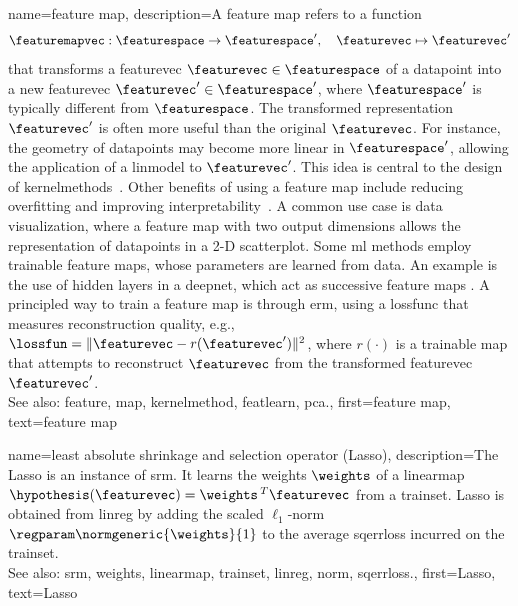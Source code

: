 {name={feature map}, 
	description={A \gls{feature} \gls{map} refers to a \gls{function} 
		$$
		\featuremapvec: \featurespace \rightarrow \featurespace', \quad \featurevec \mapsto \featurevec'
		$$
		that transforms a \gls{featurevec} $\featurevec \in \featurespace$ of 
 		a \gls{datapoint} into a new \gls{featurevec} $\featurevec' \in \featurespace'$, 
 		where $\featurespace'$ is typically different from $\featurespace$.
 		The transformed representation $\featurevec'$ is often more useful than the original 
 		$\featurevec$. For instance, the geometry of \glspl{datapoint} may become more linear 
 		in $\featurespace'$, allowing the application of a \gls{linmodel} to $\featurevec'$. 
 		This idea is central to the design of \glspl{kernelmethod}~\cite{LearningKernelsBook}.
 		Other benefits of using a \gls{feature} \gls{map} include reducing \gls{overfitting} and 
 		improving \gls{interpretability}~\cite{Ribeiro2016}. A common use case is \gls{data} 
 		visualization, where a \gls{feature} \gls{map} with two output dimensions allows the representation 
 		of \glspl{datapoint} in a 2-D \gls{scatterplot}. Some \gls{ml} methods employ trainable 
 		\gls{feature} \glspl{map}, whose \glspl{parameter} are learned from \gls{data}. An example is 
 		the use of hidden \glspl{layer} in a \gls{deepnet}, which act as successive \gls{feature} \glspl{map} 
 		\cite{MallatUnderstandingDeepLearning}. A principled way to train a \gls{feature} \gls{map} 
 		is through \gls{erm}, using a \gls{lossfunc} that measures reconstruction quality, 
 		e.g., $\lossfun = \|\featurevec - r(\featurevec')\|^2$, where $r(\cdot)$ is a trainable
 		\gls{map} that attempts to reconstruct $\featurevec$ from the transformed \gls{featurevec} $\featurevec'$.
				\\
		See also: \gls{feature}, \gls{map}, \gls{kernelmethod}, \gls{featlearn}, \gls{pca}.},
	first={feature map},
	text={feature map} 
}
	
 
 {name={least absolute shrinkage and selection operator (Lasso)}, 
	description={The Lasso \cite{Tibshirani1996}  is an 
		instance of \gls{srm}. It learns the \gls{weights} $\weights$ of a \gls{linearmap} 
		$\hypothesis(\featurevec) = \weights\,^{T} \featurevec$ from a \gls{trainset}. 
		Lasso is obtained from \gls{linreg} by adding the scaled $\ell_{1}$-\gls{norm} 
		$\regparam \normgeneric{\weights}{1}$ to the average \gls{sqerrloss} incurred on the \gls{trainset}. 
				\\
		See also: \gls{srm}, \gls{weights}, \gls{linearmap}, \gls{trainset}, \gls{linreg}, \gls{norm}, \gls{sqerrloss}.},
	first={Lasso},
	text={Lasso} 
}
 
